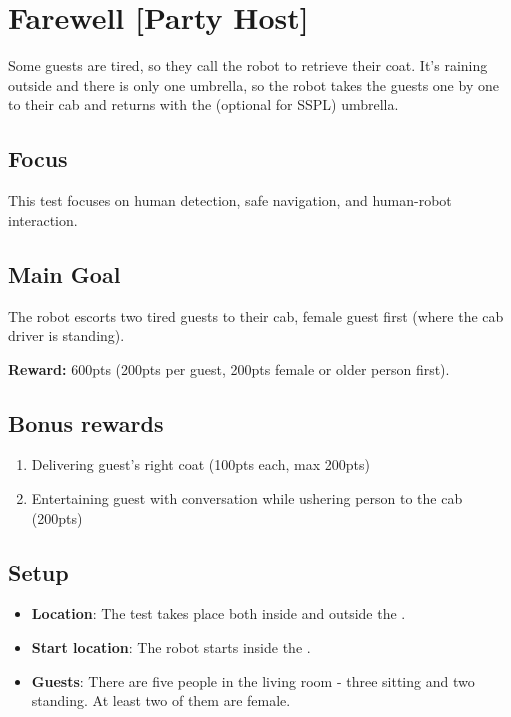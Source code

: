 \section{Farewell [Party Host]}
\label{test:farewell}
Some guests are tired, so they call the robot to retrieve their coat.
It's raining outside and there is only one umbrella, so the robot takes the guests one by one to their cab and returns with the (optional for SSPL) umbrella.

\subsection*{Focus}
This test focuses on human detection, safe navigation, and human-robot interaction.

\subsection*{Main Goal}
The robot escorts two tired guests to their cab, female guest first (where the cab driver is standing).

\noindent\textbf{Reward:} 600pts (200pts per guest, 200pts female or older person first).

\subsection*{Bonus rewards}
\begin{enumerate}[nosep]
	\item Delivering guest's right coat (100pts each, max 200pts)
	\item Entertaining guest with conversation while ushering person to the cab (200pts)	
\end{enumerate}


\subsection*{Setup}
\begin{itemize}
	\item \textbf{Location}: The test takes place both inside and outside the \Arena{}.
	\item \textbf{Start location}: The robot starts inside the \Arena{}.
	\item \textbf{Guests}: There are five people in the living room - three sitting and two standing. At least two of them are female.
\end{itemize}


